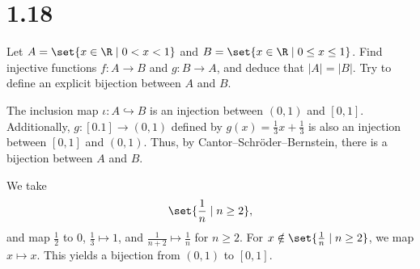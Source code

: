 \documentclass[10pt]{mypackage}
\begin{document}
\section{1.18}%
\begin{problem}
  Let $A = \set{x\in\R\mid 0 < x < 1}$ and $B = \set{x\in\R\mid 0\leq x \leq 1}$. Find injective functions $f: A\rightarrow B$ and $g: B\rightarrow A$, and deduce that $|A| = |B|$. Try to define an explicit bijection between $A$ and $B$.
\end{problem}
\begin{solution}
  The inclusion map $\iota: A\hookrightarrow B$ is an injection between $(0,1)$ and $[0,1]$. Additionally, $g: [0.1]\rightarrow (0,1)$ defined by $g(x) = \frac{1}{3}x + \frac{1}{3}$ is also an injection between $[0,1]$ and $(0,1)$. Thus, by Cantor--Schröder--Bernstein, there is a bijection between $A$ and $B$.\newline

 We take
 \begin{align*}
   \set{\frac{1}{n}\mid n\geq 2},
 \end{align*}
 and map $\frac{1}{2}$ to $0$, $\frac{1}{3}\mapsto 1$, and $\frac{1}{n+2} \mapsto \frac{1}{n}$ for $n\geq 2$. For $x\notin \set{\frac{1}{n}\mid n\geq 2}$, we map $x\mapsto x$. This yields a bijection from $\left(0,1\right)$ to $\left[0,1\right]$.
\end{solution}
\end{document}
